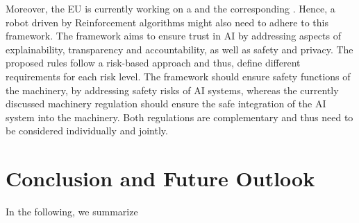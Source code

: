 \documentclass[twoside,11pt]{article}
\begin{document}
Moreover, the EU is currently working on a \cite{EC:LegalFramework} and the corresponding \cite{EUResolution:2020:ethicalAI}. Hence, a robot driven by Reinforcement algorithms might also need to adhere to this framework. The framework aims to ensure trust in AI by addressing aspects of explainability, transparency and accountability, as well as safety and privacy. The proposed rules follow a risk-based approach and thus, define different requirements for each risk level. The framework should ensure safety functions of the machinery, by addressing safety risks of AI systems, whereas the currently discussed machinery regulation should ensure the safe integration of the AI system into the machinery. Both regulations are complementary and thus need to be considered individually and jointly.

\section{Conclusion and Future Outlook}

In the following, we summarize 
\end{document}
